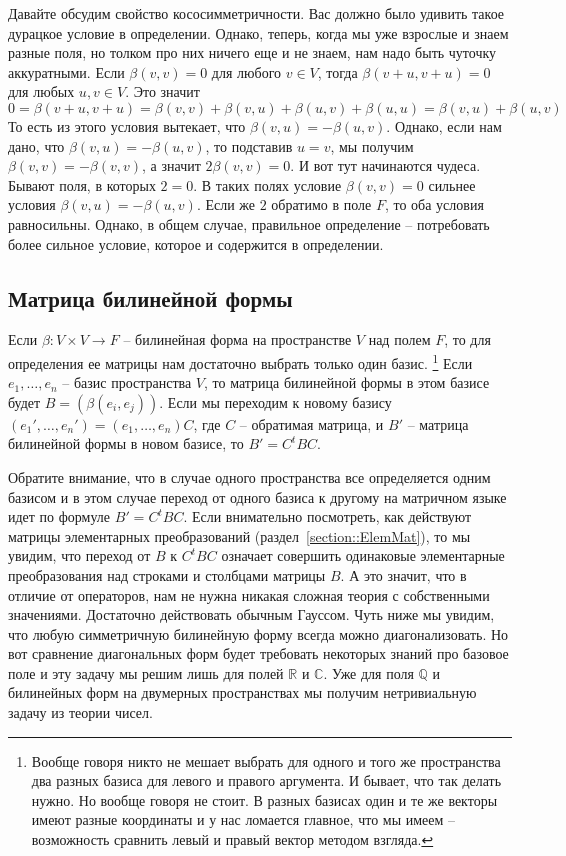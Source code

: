 Давайте обсудим свойство кососимметричности.
Вас должно было удивить такое дурацкое условие в определении.
Однако, теперь, когда мы уже взрослые и знаем разные поля, но толком про них ничего еще и не знаем, нам надо быть чуточку аккуратными.
Если $\beta(v,v) = 0$ для любого $v\in V$, тогда $\beta(v+u,v+u) = 0$ для любых $u,v\in V$.
Это значит
\[
0=\beta(v+u,v+u) = \beta(v,v) + \beta(v,u) + \beta(u,v)+\beta(u,u) = \beta(v,u) + \beta(u,v)
\]
То есть из этого условия вытекает, что $\beta(v,u) = -\beta(u,v)$.
Однако, если нам дано, что $\beta(v,u) = -\beta(u,v)$, то подставив $u = v$, мы получим $\beta(v,v) = -\beta(v,v)$, а значит $2\beta(v,v) = 0$.
И вот тут начинаются чудеса.
Бывают поля, в которых $2 = 0$.
В таких полях условие $\beta(v,v) = 0$ сильнее условия $\beta(v,u) = -\beta(u,v)$.
Если же $2$ обратимо в поле $F$, то оба условия равносильны.
Однако, в общем случае, правильное определение -- потребовать более сильное условие, которое и содержится в определении.


\subsection{Матрица билинейной формы}

Если $\beta\colon V\times V\to F$ -- билинейная форма на пространстве $V$ над полем $F$, то для определения ее матрицы нам достаточно выбрать только один базис.%
\footnote{Вообще говоря никто не мешает выбрать для одного и того же пространства два разных базиса для левого и правого аргумента.
И бывает, что так делать нужно.
Но вообще говоря не стоит.
В разных базисах один и те же векторы имеют разные координаты и у нас ломается главное, что мы имеем -- возможность сравнить левый и правый вектор методом взгляда.}
Если $e_1,\ldots,e_n$ -- базис пространства $V$, то матрица билинейной формы в этом базисе будет $B = (\beta(e_i, e_j))$.
Если мы переходим к новому базису $(e_1',\ldots,e_n') = (e_1,\ldots,e_n) C$, где $C$ -- обратимая матрица, и $B'$ -- матрица билинейной формы в новом базисе, то $B' = C^t B C$.

Обратите внимание, что в случае одного пространства все определяется одним базисом и в этом случае переход от одного базиса к другому на матричном языке идет по формуле $B' = C^t B C$.
Если внимательно посмотреть, как действуют матрицы элементарных преобразований (раздел~\ref{section::ElemMat}), то мы увидим, что переход от $B$ к $C^tBC$ означает совершить одинаковые элементарные преобразования над строками и столбцами матрицы $B$.
А это значит, что в отличие от операторов, нам не нужна никакая сложная теория с собственными значениями.
Достаточно действовать обычным Гауссом.
Чуть ниже мы увидим, что любую симметричную билинейную форму всегда можно диагонализовать.
Но вот сравнение диагональных форм будет требовать некоторых знаний про базовое поле и эту задачу мы решим лишь для полей $\mathbb R$ и $\mathbb C$.
Уже для поля $\mathbb Q$ и билинейных форм на двумерных пространствах мы получим нетривиальную задачу из теории чисел.

